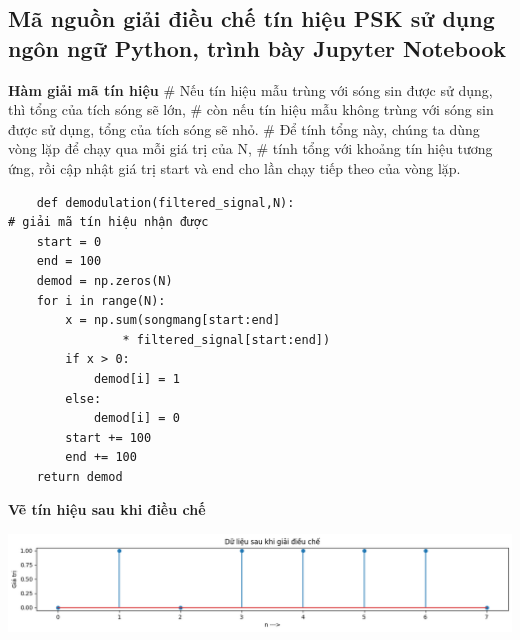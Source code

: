 \subsection{Mã nguồn giải điều chế tín hiệu PSK sử dụng ngôn ngữ Python,
trình bày Jupyter Notebook}
\textbf{Hàm giải mã tín hiệu}
# Nếu tín hiệu mẫu trùng với sóng sin được sử dụng, thì tổng của tích sóng sẽ lớn, 
# còn nếu tín hiệu mẫu không trùng với sóng sin được sử dụng, tổng của tích sóng sẽ nhỏ.
# Để tính tổng này, chúng ta dùng vòng lặp để chạy qua mỗi giá trị của N, 
# tính tổng với khoảng tín hiệu tương ứng, rồi cập nhật giá trị start và end cho lần chạy tiếp theo của vòng lặp.
\begin{lstlisting}
    def demodulation(filtered_signal,N):                                # giải mã tín hiệu nhận được
    start = 0
    end = 100
    demod = np.zeros(N)
    for i in range(N):
        x = np.sum(songmang[start:end] 
                * filtered_signal[start:end])
        if x > 0:
            demod[i] = 1
        else:
            demod[i] = 0
        start += 100
        end += 100
    return demod
\end{lstlisting}
\textbf{Vẽ tín hiệu sau khi điều chế }
\begin{center}
     \includegraphics[scale=.5]{Img/dulieusaudieuche.png}
\end{center}
\newpage
